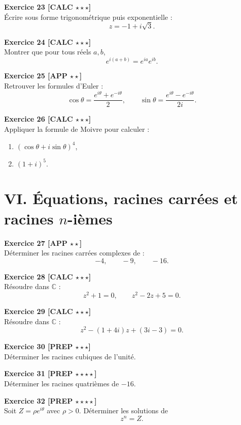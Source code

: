 \documentclass[11pt,a4paper]{article}
\newcommand{\C}{\mathbb{C}}
\begin{document}
\textbf{Exercice 23 [CALC $\star\star\star$]}\\
Écrire sous forme trigonométrique puis exponentielle :
\[
z=-1+i\sqrt{3}.
\]

\textbf{Exercice 24 [CALC $\star\star\star$]}\\
Montrer que pour tous réels \(a,b\),
\[
e^{i(a+b)}=e^{ia}e^{ib}.
\]

\textbf{Exercice 25 [APP $\star\star$]}\\
Retrouver les formules d’Euler :
\[
\cos \theta=\frac{e^{i\theta}+e^{-i\theta}}{2},
\qquad
\sin \theta=\frac{e^{i\theta}-e^{-i\theta}}{2i}.
\]

\textbf{Exercice 26 [CALC $\star\star\star$]}\\
Appliquer la formule de Moivre pour calculer :
\begin{enumerate}[label=\alph*)]
    \item \((\cos\theta+i\sin\theta)^4\),
    \item \((1+i)^5\).
\end{enumerate}

\section*{VI. Équations, racines carrées et racines \(n\)-ièmes}

\textbf{Exercice 27 [APP $\star\star$]}\\
Déterminer les racines carrées complexes de :
\[
-4,\qquad -9,\qquad -16.
\]

\textbf{Exercice 28 [CALC $\star\star\star$]}\\
Résoudre dans \(\C\) :
\[
z^2+1=0,\qquad z^2-2z+5=0.
\]

\textbf{Exercice 29 [CALC $\star\star\star$]}\\
Résoudre dans \(\C\) :
\[
z^2-(1+4i)z+(3i-3)=0.
\]

\textbf{Exercice 30 [PREP $\star\star\star$]}\\
Déterminer les racines cubiques de l’unité.

\textbf{Exercice 31 [PREP $\star\star\star\star$]}\\
Déterminer les racines quatrièmes de \(-16\).

\textbf{Exercice 32 [PREP $\star\star\star\star$]}\\
Soit \(Z=\rho e^{i\theta}\) avec \(\rho>0\). Déterminer les solutions de
\[
z^n=Z.
\]
\end{document}
